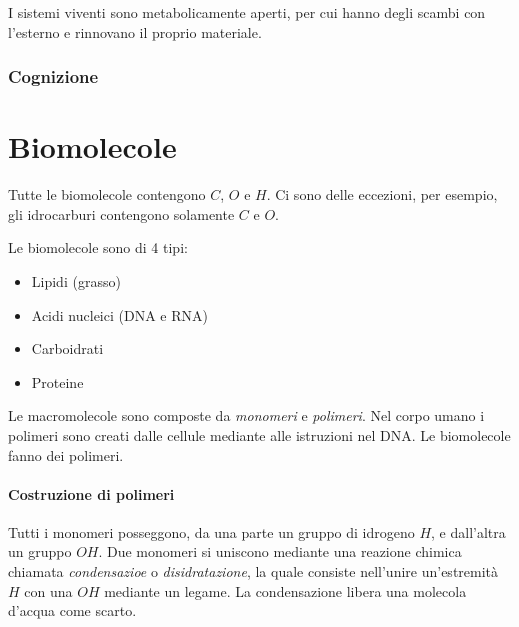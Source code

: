 \documentclass[a4paper]{article}
\begin{document}
I sistemi viventi sono metabolicamente aperti, per cui hanno degli scambi con l'esterno
e rinnovano il proprio materiale.

\subsubsection{Cognizione}


\pagebreak

\section{Biomolecole}


Tutte le biomolecole contengono \(C\), \(O\) e \(H\).
Ci sono delle eccezioni, per esempio, gli idrocarburi contengono solamente \(C\) e \(O\).

Le biomolecole sono di 4 tipi:
\begin{itemize}
    \item Lipidi (grasso)
    \item Acidi nucleici (DNA e RNA)
    \item Carboidrati
    \item Proteine
\end{itemize}

Le macromolecole sono composte da \textit{monomeri} e \textit{polimeri}.
Nel corpo umano i polimeri sono creati dalle cellule mediante alle istruzioni nel DNA.
Le biomolecole fanno dei polimeri.


\paragraph{Costruzione di polimeri}

Tutti i monomeri posseggono, da una parte un gruppo di idrogeno \(H\),
e dall'altra un gruppo \(OH\).
Due monomeri si uniscono mediante una reazione chimica chiamata \textit{condensazioe} o \textit{disidratazione}, la quale consiste
nell'unire un'estremità \(H\) con una \(OH\) mediante un legame.
La condensazione libera una molecola d'acqua come scarto.
\end{document}
